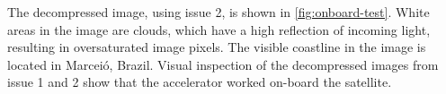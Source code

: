 The decompressed image, using issue 2, is shown in \autoref{fig:onboard-test}. White areas in the image are clouds, which have a high reflection of incoming light, resulting in oversaturated image pixels. The visible coastline in the image is located in Marceió, Brazil. Visual inspection of the decompressed images from issue 1 and 2 show that the accelerator worked on-board the satellite.






